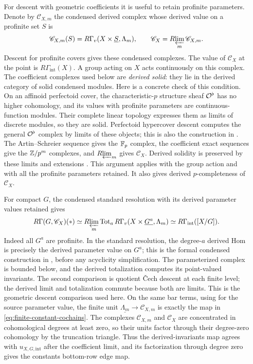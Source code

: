 For descent with geometric coefficients it is useful to retain
profinite parameters.  Denote by $\mathscr C_{X,m}$ the condensed
derived complex whose derived value on a profinite set $S$ is
\[
 \mathscr C_{X,m}(S)=R\Gamma_v(X\times\underline S,\Lambda_m),
 \qquad \mathscr C_X=R\!\varprojlim_m\mathscr C_{X,m}.
\]
Descent for profinite covers gives these condensed complexes.  The value
of $\mathscr C_X$ at the point is $R\Gamma_{\mathrm{int}}(X)$.
A group acting on $X$ acts continuously
on this complex.  The coefficient complexes used below are
\emph{derived solid}: they lie in the derived category of solid
condensed modules.  Here is a concrete check of this condition.
On an affinoid perfectoid cover, the characteristic-$p$ structure
sheaf $\mathcal O^\flat$ has no higher cohomology, and its values with
profinite parameters are continuous-function modules.  Their complete
linear topology expresses them as limits of discrete modules, so
they are solid.  Perfectoid hypercover descent computes the general
$\mathcal O^\flat$ complex by limits of these objects; this is also the
construction in \cite[Theorem~3.2.1(iii) and Remark~3.2.2]{BMR2026}.
The Artin--Schreier
sequence gives the $\mathbb F_p$ complex, the coefficient exact sequences
give the $\mathbb Z/p^m$ complexes, and $R\!\varprojlim_m$ gives $\mathscr C_X$.
Derived solidity is preserved by these limits and extensions
\cite[Theorem~4.4(ii)]{Tang2026}.  This argument applies with the
group action and with all the profinite parameters retained.  It
also gives derived $p$-completeness of $\mathscr C_X$.

For compact $G$, the condensed standard resolution with its derived
parameter values retained gives
\begin{equation}\label{eq:geometric-group-descent}
 R\Gamma(G,\mathscr C_X)(*)\simeq
 R\!\varprojlim_m\operatorname{Tot}_{a}R\Gamma_v
        (X\times\underline{G^a},\Lambda_m)
 \simeq R\Gamma_{\mathrm{int}}([X/G]).
\end{equation}
Indeed all $G^a$ are profinite.  In the standard resolution, the
degree-$a$ derived Hom is precisely the derived parameter value on
$G^a$; this is the formal condensed construction in
\cite[\S2, pp.~5--6]{Anschutz2020}, before any acyclicity simplification.
The parameterized complex is bounded below, and the derived
totalization computes its point-valued invariants.  The second
comparison is quotient \v{C}ech descent at each finite level; the
derived limit and totalization commute because both are limits.
This is the geometric descent comparison used here.  On the same bar
terms, using \cite[Lemma~2.2]{Anschutz2020} for the source parameter
value, the finite unit $\underline{\Lambda_m}\to\mathscr C_{X,m}$
is exactly the map in \eqref{eq:finite-constant-cochains}.  The complexes
$\mathscr C_{X,m}$ and $\mathscr C_X$ are concentrated in cohomological
degrees at least zero, so their units factor through their degree-zero
cohomology by the truncation triangle.  Thus the derived-invariants map
agrees with $u_{X,G,\mathrm{int}}$ after the coefficient limit, and its
factorization through degree zero gives the constants bottom-row edge map.

